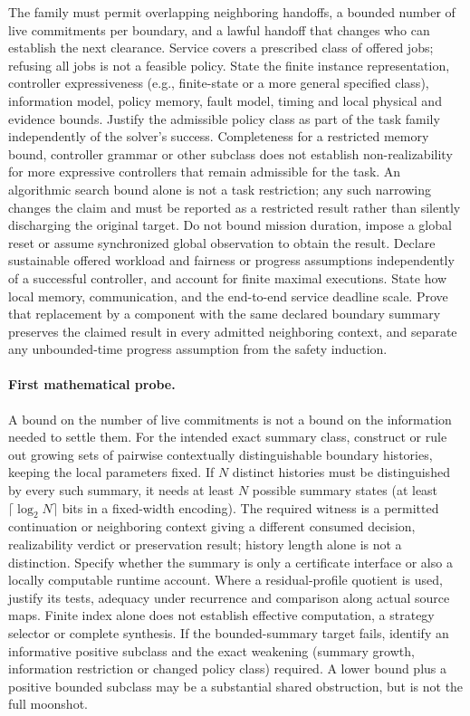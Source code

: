 \documentclass[11pt]{article}
\begin{document}
The family must permit overlapping neighboring handoffs, a bounded number of live commitments per boundary, and a lawful handoff that changes who can establish the next clearance. Service covers a prescribed class of offered jobs; refusing all jobs is not a feasible policy. State the finite instance representation, controller expressiveness (e.g., finite-state or a more general specified class), information model, policy memory, fault model, timing and local physical and evidence bounds. Justify the admissible policy class as part of the task family independently of the solver's success. Completeness for a restricted memory bound, controller grammar or other subclass does not establish non-realizability for more expressive controllers that remain admissible for the task. An algorithmic search bound alone is not a task restriction; any such narrowing changes the claim and must be reported as a restricted result rather than silently discharging the original target. Do not bound mission duration, impose a global reset or assume synchronized global observation to obtain the result. Declare sustainable offered workload and fairness or progress assumptions independently of a successful controller, and account for finite maximal executions. State how local memory, communication, and the end-to-end service deadline scale. Prove that replacement by a component with the same declared boundary summary preserves the claimed result in every admitted neighboring context, and separate any unbounded-time progress assumption from the safety induction.

\paragraph{First mathematical probe.} A bound on the number of live commitments is not a bound on the information needed to settle them. For the intended exact summary class, construct or rule out growing sets of pairwise contextually distinguishable boundary histories, keeping the local parameters fixed. If $N$ distinct histories must be distinguished by every such summary, it needs at least $N$ possible summary states (at least $\lceil\log_2 N\rceil$ bits in a fixed-width encoding). The required witness is a permitted continuation or neighboring context giving a different consumed decision, realizability verdict or preservation result; history length alone is not a distinction. Specify whether the summary is only a certificate interface or also a locally computable runtime account. Where a residual-profile quotient is used, justify its tests, adequacy under recurrence and comparison along actual source maps. Finite index alone does not establish effective computation, a strategy selector or complete synthesis. If the bounded-summary target fails, identify an informative positive subclass and the exact weakening (summary growth, information restriction or changed policy class) required. A lower bound plus a positive bounded subclass may be a substantial shared obstruction, but is not the full moonshot.
\end{document}
